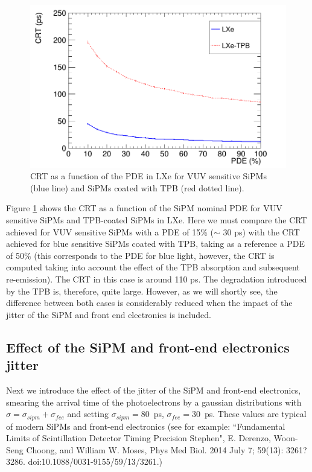\documentclass[review]{elsarticle}
\begin{document}
\begin{figure}[!bhtp]
	\centering
	\includegraphics[scale=0.4]{../img/CRTvsPDELXeTPBNoJitter.png}
	\caption{\label{fig.crt2} CRT as a function of the PDE in LXe for VUV sensitive SiPMs (blue line) and SiPMs coated with TPB (red dotted line). }
\end{figure}

Figure \ref{fig.crt2} shows the CRT as a function of the
 SiPM nominal PDE for VUV sensitive SiPMs and TPB-coated SiPMs in LXe. Here we must compare the CRT achieved for VUV sensitive SiPMs with a PDE of 15\% ($\sim$ 30 ps) with the CRT achieved for blue sensitive SiPMs coated with TPB, taking as a reference a PDE of 50\% (this corresponds to the
 PDE for blue light,  however, the CRT is computed taking into account the effect of the TPB absorption and subsequent re-emission).  The CRT in this case is around 110 ps. The degradation introduced by the TPB is, therefore, quite large. However, as we will shortly see, the difference between both cases  is
 considerably reduced when the impact of the jitter of the SiPM and front end electronics is included. 
  
\subsection*{Effect of the SiPM  and front-end electronics jitter}
  Next we introduce the effect of the jitter of the SiPM and front-end electronics, smearing the arrival time of the photoelectrons by a gaussian distributions with $\sigma = \sigma_{sipm} +  \sigma_{fee}$ and setting 
 $\sigma_{sipm} = 80$~ps, $\sigma_{fee} = 30$~ps. These values are typical of modern SiPMs and front-end electronics (see for example: ``Fundamental Limits of Scintillation Detector Timing Precision Stephen", E. Derenzo, Woon-Seng Choong, and William W. Moses,
Phys Med Biol. 2014 July 7; 59(13): 3261?3286. doi:10.1088/0031-9155/59/13/3261.)
 
\end{document}
